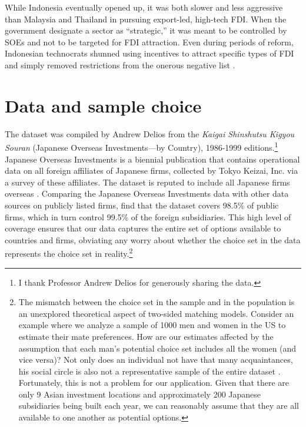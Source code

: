 While Indonesia eventually opened up, it was both slower and less aggressive
than Malaysia and Thailand in pursuing export-led, high-tech FDI. When the
government designate a sector as ``strategic,'' it was meant to be controlled by
SOEs and not to be targeted for FDI attraction. Even during periods of reform,
Indonesian technocrats shunned using incentives to attract specific types of FDI
and simply removed restrictions from the onerous negative list
\citep[118-124]{Felker2003}.

\section{Data and sample choice}
\label{sec:Japan_sample}

The dataset was compiled by Andrew Delios from the \textit{Kaigai Shinshutsu
  Kigyou Souran} (Japanese Overseas Investments---by Country), 1986-1999
editions.\footnote{I thank Professor Andrew Delios for generously
  sharing the data.} Japanese Overseas Investments is a biennial publication that contains operational data on all foreign affiliates
of Japanese firms, collected by Tokyo Keizai, Inc. via a survey of these
affiliates. The dataset is reputed to include all Japanese firms overseas
\citep{Yamawaki1991}. Comparing the Japanese Overseas Investments data with other
data sources on publicly listed firms, \citet{Delios2001} find that the dataset
covers 98.5\% of public firms, which in turn control 99.5\% of the foreign
subsidiaries. This high level of coverage ensures that our data captures the
entire set of options available to countries and firms, obviating any worry
about whether the choice set in the data represents the choice set in
reality.\footnote{The mismatch between the choice set in the sample and in the
  population is an unexplored theoretical aspect of two-sided matching models.
  Consider an example where we analyze a sample of 1000 men and women in the US
  to estimate their mate preferences. How are our estimates affected by the 
  assumption that each man's potential choice set includes all the women
  (and vice versa)? Not only does an individual not have that many
  acquaintances, his social circle is also not a representative sample of the
  entire dataset \citep[568]{Logan2008}. Fortunately, this is not a problem for
  our application. Given that there are only 9 Asian investment locations and
  approximately 200 Japanese subsidiaries being built each year, we can
  reasonably assume that they are all available to one another as potential
  options.}


